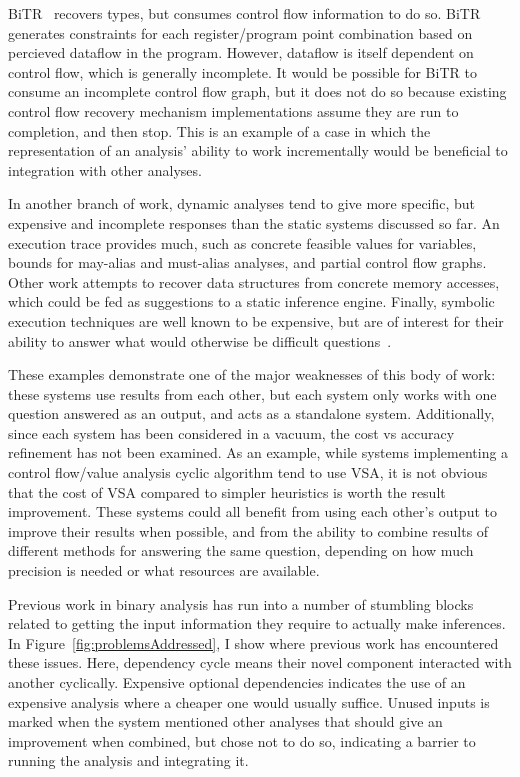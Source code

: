 BiTR~\cite{bitr} recovers types, but consumes control flow information to do so.
BiTR generates constraints for each register/program point combination based on percieved dataflow in the program.
However, dataflow is itself dependent on control flow, which is generally incomplete.
It would be possible for BiTR to consume an incomplete control flow graph, but it does not do so because existing control flow recovery mechanism implementations assume they are run to completion, and then stop.
This is an example of a case in which the representation of an analysis' ability to work incrementally would be beneficial to integration with other analyses.

In another branch of work, dynamic analyses tend to give more specific, but expensive and incomplete responses than the static systems discussed so far.
An execution trace provides much, such as concrete feasible values for variables, bounds for may-alias and must-alias analyses, and partial control flow graphs.
Other work attempts to recover data structures from concrete memory accesses, which could be fed as suggestions to a static inference engine.
Finally, symbolic execution techniques are well known to be expensive, but are of interest for their ability to answer what would otherwise be difficult questions~\cite{mayhem}.

These examples demonstrate one of the major weaknesses of this body of work: these systems use results from each other, but each system only works with one question answered as an output, and acts as a standalone system.
Additionally, since each system has been considered in a vacuum, the cost vs accuracy refinement has not been examined.
As an example, while systems implementing a control flow/value analysis cyclic algorithm tend to use VSA, it is not obvious that the cost of VSA compared to simpler heuristics is worth the result improvement.
These systems could all benefit from using each other's output to improve their results when possible, and from the ability to combine results of different methods for answering the same question, depending on how much precision is needed or what resources are available.

Previous work in binary analysis has run into a number of stumbling blocks related to getting the input information they require to actually make inferences. 
In Figure~\ref{fig:problemsAddressed}, I show where previous work has encountered these issues.
Here, dependency cycle means their novel component interacted with another cyclically.
Expensive optional dependencies indicates the use of an expensive analysis where a cheaper one would usually suffice.
Unused inputs is marked when the system mentioned other analyses that should give an improvement when combined, but chose not to do so, indicating a barrier to running the analysis and integrating it.

